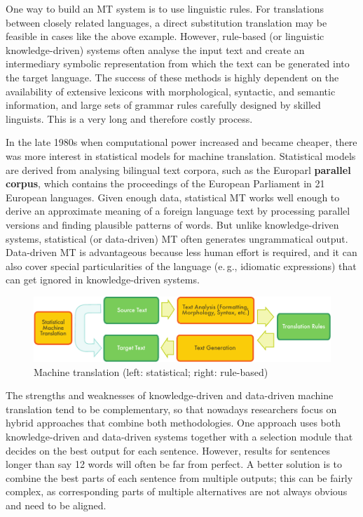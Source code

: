 \begin{multicols}{2}
One way to build an MT system is to use linguistic rules. For translations between closely related languages, a direct substitution translation may be feasible in cases like the above example. However, rule-based (or linguistic knowledge-driven) systems often analyse the input text and create an intermediary symbolic representation from which the text can be generated into the target language. The success of these methods is highly dependent on the availability of extensive lexicons with morphological, syntactic, and semantic information, and large sets of grammar rules carefully designed by skilled linguists. This is a very long and therefore costly process.

In the late 1980s when computational power increased and became cheaper, there was more interest in statistical models for machine translation. Statistical models are derived from analysing bilingual text corpora, such as the Europarl \textbf{parallel corpus}, which contains the proceedings of the European Parliament in 21 European languages. Given enough data, statistical MT works well enough to derive an approximate meaning of a foreign language text by processing parallel versions and finding plausible patterns of words. But unlike knowledge-driven systems, statistical (or data-driven) MT often generates ungrammatical output.  Data-driven MT is advantageous because less human effort is required, and it can also cover special particularities of the language (e.\,g., idiomatic expressions) that can get ignored in knowledge-driven systems.

\begin{figure}[htb]
  \center
  \includegraphics[width=\textwidth]{../_media/english/machine_translation}
  \caption{Machine translation (left: statistical; right: rule-based)}
  \label{fig:mtarch-eng}
\end{figure}

The strengths and weaknesses of knowledge-driven and data-driven machine translation tend to be complementary, so that nowadays researchers focus on hybrid approaches that combine both methodologies. One approach uses both knowledge-driven and data-driven systems together with a selection module that decides on the best output for each sentence. However, results for sentences longer than say 12 words will often be far from perfect. A better solution is to combine the best parts of each sentence from multiple outputs; this can be fairly complex, as corresponding parts of multiple alternatives are not always obvious and need to be aligned.


\end{multicols}

